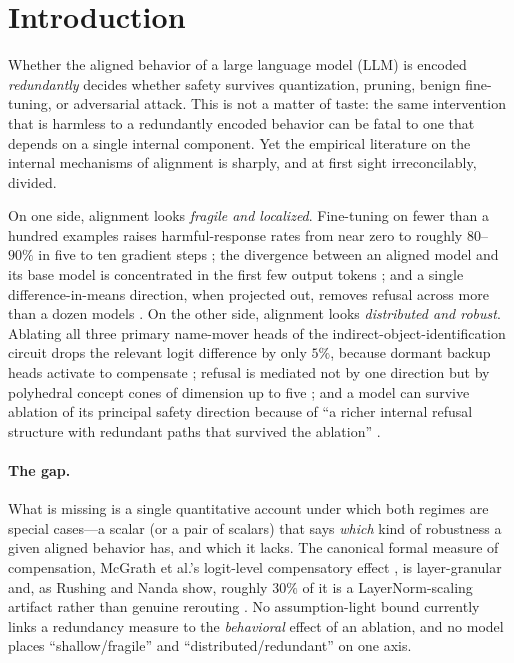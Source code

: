\section{Introduction}
\label{sec:intro}

Whether the aligned behavior of a large language model (LLM) is encoded
\emph{redundantly} decides whether safety survives quantization, pruning, benign
fine-tuning, or adversarial attack. This is not a matter of taste: the same
intervention that is harmless to a redundantly encoded behavior can be fatal to one
that depends on a single internal component. Yet the empirical literature on the
internal mechanisms of alignment is sharply, and at first sight irreconcilably,
divided.

On one side, alignment looks \emph{fragile and localized}. Fine-tuning on fewer than
a hundred examples raises harmful-response rates from near zero to roughly
$80$--$90\%$ in five to ten gradient steps \cite{qi2023finetuning}; the divergence
between an aligned model and its base model is concentrated in the first few output
tokens \cite{qi2024shallow}; and a single difference-in-means direction, when
projected out, removes refusal across more than a dozen models \cite{arditi2024refusal}.
On the other side, alignment looks \emph{distributed and robust}. Ablating all three
primary name-mover heads of the indirect-object-identification circuit drops the
relevant logit difference by only $5\%$, because dormant backup heads activate to
compensate \cite{wang2022ioi}; refusal is mediated not by one direction but by
polyhedral concept cones of dimension up to five \cite{wollschlager2025cones}; and a
model can survive ablation of its principal safety direction because of ``a richer
internal refusal structure with redundant paths that survived the ablation''
\cite{joad2026directions}.

\paragraph{The gap.}
What is missing is a single quantitative account under which both regimes are special
cases---a scalar (or a pair of scalars) that says \emph{which} kind of robustness a
given aligned behavior has, and which it lacks. The canonical formal measure of
compensation, McGrath et al.'s logit-level compensatory effect \cite{mcgrath2023hydra},
is layer-granular and, as Rushing and Nanda show, roughly $30\%$ of it is a
LayerNorm-scaling artifact rather than genuine rerouting \cite{rushing2024selfrepair}.
No assumption-light bound currently links a redundancy measure to the
\emph{behavioral} effect of an ablation, and no model places ``shallow/fragile'' and
``distributed/redundant'' on one axis.

